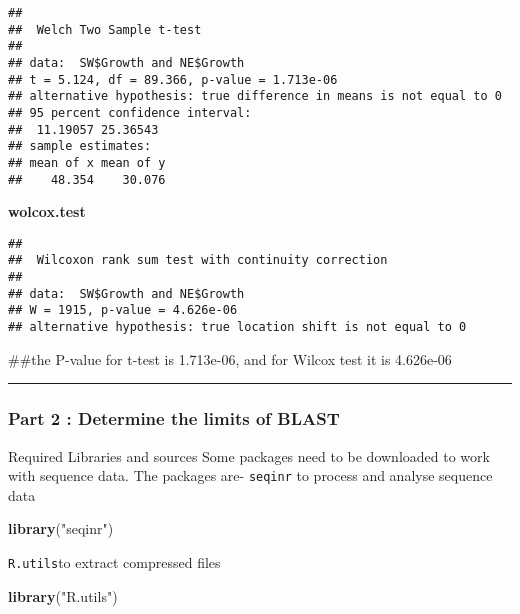 \documentclass[]{article}
\newenvironment{Shaded}{\begin{snugshade}}{\end{snugshade}}
\newcommand{\KeywordTok}[1]{\textcolor[rgb]{0.13,0.29,0.53}{\textbf{#1}}}
\newcommand{\NormalTok}[1]{#1}
\newcommand{\OperatorTok}[1]{\textcolor[rgb]{0.81,0.36,0.00}{\textbf{#1}}}
\newcommand{\StringTok}[1]{\textcolor[rgb]{0.31,0.60,0.02}{#1}}
\begin{document}
\begin{verbatim}
## 
##  Welch Two Sample t-test
## 
## data:  SW$Growth and NE$Growth
## t = 5.124, df = 89.366, p-value = 1.713e-06
## alternative hypothesis: true difference in means is not equal to 0
## 95 percent confidence interval:
##  11.19057 25.36543
## sample estimates:
## mean of x mean of y 
##    48.354    30.076
\end{verbatim}

\textbf{wolcox.test}

\begin{Shaded}
\end{Shaded}

\begin{verbatim}
## 
##  Wilcoxon rank sum test with continuity correction
## 
## data:  SW$Growth and NE$Growth
## W = 1915, p-value = 4.626e-06
## alternative hypothesis: true location shift is not equal to 0
\end{verbatim}

\#\#the P-value for t-test is 1.713e-06, and for Wilcox test it is
4.626e-06

\begin{center}\rule{0.5\linewidth}{0.5pt}\end{center}

\hypertarget{part-2-determine-the-limits-of-blast}{%
\subsubsection{Part 2 : Determine the limits of
BLAST}\label{part-2-determine-the-limits-of-blast}}

Required Libraries and sources Some packages need to be downloaded to
work with sequence data. The packages are- \texttt{seqinr} to process
and analyse sequence data

\begin{Shaded}
\begin{Highlighting}[]
\KeywordTok{library}\NormalTok{(}\StringTok{"seqinr"}\NormalTok{)}
\end{Highlighting}
\end{Shaded}

\texttt{R.utils}to extract compressed files

\begin{Shaded}
\begin{Highlighting}[]
\KeywordTok{library}\NormalTok{(}\StringTok{"R.utils"}\NormalTok{)}
\end{Highlighting}
\end{Shaded}
\end{document}
